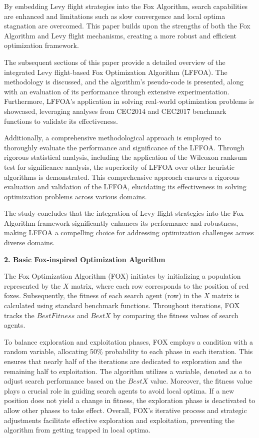 \documentclass[
]{article}
\begin{document}
\begin{justify}
By embedding Levy flight strategies into the Fox Algorithm, search capabilities are enhanced and limitations such as slow convergence and local optima stagnation are overcomed. This paper builds upon the strengths of both the Fox Algorithm and Levy flight mechanisms, creating a more robust and efficient optimization framework.

The subsequent sections of this paper provide a detailed overview of the integrated Levy flight-based Fox Optimization Algorithm (LFFOA). The methodology is discussed, and the algorithm's pseudo-code is presented, along with an evaluation of its performance through extensive experimentation. Furthermore, LFFOA's application in solving real-world optimization problems is showcased, leveraging analyses from CEC2014 and CEC2017 benchmark functions to validate its effectiveness.

Additionally, a comprehensive methodological approach is employed to thoroughly evaluate the performance and significance of the LFFOA. Through rigorous statistical analysis, including the application of the Wilcoxon ranksum test for significance analysis, the superiority of LFFOA over other heuristic algorithms is demonstrated. This comprehensive approach ensures a rigorous evaluation and validation of the LFFOA, elucidating its effectiveness in solving optimization problems across various domains.

The study concludes that the integration of Levy flight strategies into the Fox Algorithm framework significantly enhances its performance and robustness, making LFFOA a compelling choice for addressing optimization challenges across diverse domains.

\def\labelenumi{\arabic{enumi}.}
\item
\vspace{5mm}
  \textbf{2. Basic Fox-inspired Optimization Algorithm}

The Fox Optimization Algorithm (FOX) initiates by initializing a population represented by the \(X\) matrix, where each row corresponds to the position of red foxes. Subsequently, the fitness of each search agent (row) in the \(X\) matrix is calculated using standard benchmark functions. Throughout iterations, FOX tracks the \(BestFitness\) and \(BestX\) by comparing the fitness values of search agents.

To balance exploration and exploitation phases, FOX employs a condition with a random variable, allocating 50\% probability to each phase in each iteration. This ensures that nearly half of the iterations are dedicated to exploration and the remaining half to exploitation. The algorithm utilizes a variable, denoted as \(a\) to adjust search performance based on the \(BestX\) value. Moreover, the fitness value plays a crucial role in guiding search agents to avoid local optima. If a new position does not yield a change in fitness, the exploration phase is deactivated to allow other phases to take effect. Overall, FOX's iterative process and strategic adjustments facilitate effective exploration and exploitation, preventing the algorithm from getting trapped in local optima.


\end{justify}
\end{document}
